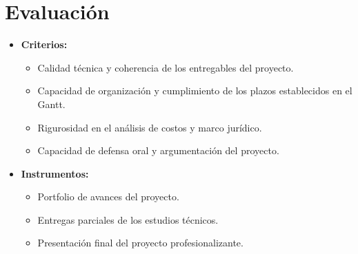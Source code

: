 \section*{Evaluación}
\begin{itemize}[label=\textbullet]
    \item \textbf{Criterios:}
    \begin{itemize}
        \item Calidad técnica y coherencia de los entregables del proyecto.
        \item Capacidad de organización y cumplimiento de los plazos establecidos en el Gantt.
        \item Rigurosidad en el análisis de costos y marco jurídico.
        \item Capacidad de defensa oral y argumentación del proyecto.
    \end{itemize}
    \item \textbf{Instrumentos:}
    \begin{itemize}
        \item Portfolio de avances del proyecto.
        \item Entregas parciales de los estudios técnicos.
        \item Presentación final del proyecto profesionalizante.
    \end{itemize}
\end{itemize}